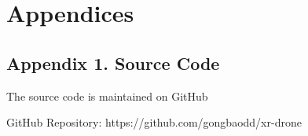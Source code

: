 
\newpage
\section{Appendices}

\subsection{Appendix 1. Source Code}

The source code is maintained on GitHub

GitHub Repository: https://github.com/gongbaodd/xr-drone



